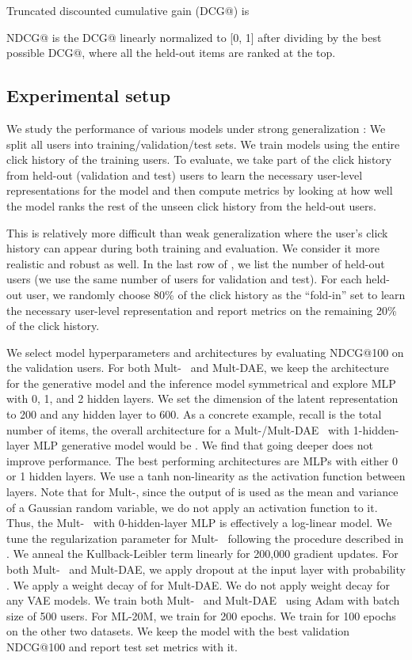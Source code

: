 \documentclass[sigconf]{acmart}
\newcommand{\mvae}{{\small Mult-}}
\newcommand{\mdae}{{\small Mult-}\gls{DAE}}
\begin{document}
Truncated discounted cumulative gain (DCG@) is


NDCG@ is the DCG@ linearly normalized to [0, 1] after dividing by the best possible DCG@, where all the held-out items are ranked at the top. 

\subsection{Experimental setup}
We study the performance of various models under strong generalization \citep{marlin2004collaborative}: We split all users into training/validation/test sets. We train models using the entire click history of the training users. To evaluate, we take part of the click history from held-out (validation and test) users to learn the necessary user-level representations for the model and then compute metrics by looking at how well the model ranks the rest of the unseen click history from the held-out users. 

This is relatively more difficult than weak generalization where the user's click history can appear during both training and evaluation. We consider it more realistic and robust as well. In the last row of , we list the number of held-out users (we use the same number of users for validation and test). For each held-out user, we randomly choose 80\% of the click history as the ``fold-in'' set to learn the necessary user-level representation and report metrics on the remaining 20\% of the click history. 

We select model hyperparameters and architectures by evaluating NDCG@100 on the validation users. For both \mvae~ and \mdae, we keep the architecture for the generative model  and the inference model  symmetrical and explore \gls{MLP} with 0, 1, and 2 hidden layers. We set the dimension of the latent representation  to 200 and any hidden layer to 600. As a concrete example, recall  is the total number of items, the overall architecture for a \mvae/\mdae~ with 1-hidden-layer \gls{MLP} generative model would be . We find that going deeper does not improve performance. 
The best performing architectures are \glspl{MLP} with either 0 or 1 hidden layers. 
We use a tanh non-linearity as the activation function between layers. Note that for \mvae, since the output of  is used as the mean and variance of a Gaussian random variable, we do not apply an activation function to it. Thus, the \mvae~ with 0-hidden-layer \gls{MLP} is effectively a log-linear model.
We tune the regularization parameter  for \mvae~ following the procedure described in . We anneal the Kullback-Leibler term linearly for 200,000 gradient updates. For both \mvae~ and \mdae, we apply dropout at the input layer with probability . We apply a weight decay of  for \mdae. We do not apply weight decay for any \gls{VAE} models.
We train both \mvae~ and \mdae~ using Adam \citep{kingma2014adam} with batch size of 500 users. For ML-20M, we train for 200 epochs. We train for 100 epochs on the other two datasets. We keep the model with the best validation NDCG@100 and report test set metrics with it. 
\end{document}

